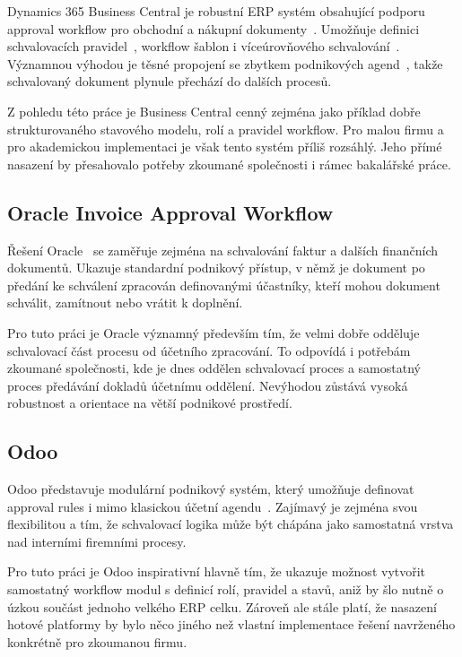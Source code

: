 Dynamics 365 Business Central je robustní ERP systém obsahující podporu approval workflow pro obchodní a nákupní dokumenty~\cite{ref10}. Umožňuje definici schvalovacích pravidel~\cite{ref12}, workflow šablon i víceúrovňového schvalování~\cite{ref11}. Významnou výhodou je těsné propojení se zbytkem podnikových agend~\cite{ref13}, takže schvalovaný dokument plynule přechází do dalších procesů.

Z pohledu této práce je Business Central cenný zejména jako příklad dobře strukturovaného stavového modelu, rolí a pravidel workflow. Pro malou firmu a pro akademickou implementaci je však tento systém příliš rozsáhlý. Jeho přímé nasazení by přesahovalo potřeby zkoumané společnosti i rámec bakalářské práce.


\subsection{Oracle Invoice Approval Workflow}

Řešení Oracle~\cite{ref14, ref15, ref16} se zaměřuje zejména na schvalování faktur a dalších finančních dokumentů. Ukazuje standardní podnikový přístup, v němž je dokument po předání ke schválení zpracován definovanými účastníky, kteří mohou dokument schválit, zamítnout nebo vrátit k doplnění.

Pro tuto práci je Oracle významný především tím, že velmi dobře odděluje schvalovací část procesu od účetního zpracování. To odpovídá i potřebám zkoumané společnosti, kde je dnes oddělen schvalovací proces a samostatný proces předávání dokladů účetnímu oddělení. Nevýhodou zůstává vysoká robustnost a orientace na větší podnikové prostředí.


\subsection{Odoo}

Odoo představuje modulární podnikový systém, který umožňuje definovat approval rules i mimo klasickou účetní agendu~\cite{ref17, ref18}. Zajímavý je zejména svou flexibilitou a tím, že schvalovací logika může být chápána jako samostatná vrstva nad interními firemními procesy.

Pro tuto práci je Odoo inspirativní hlavně tím, že ukazuje možnost vytvořit samostatný workflow modul s definicí rolí, pravidel a stavů, aniž by šlo nutně o úzkou součást jednoho velkého ERP celku. Zároveň ale stále platí, že nasazení hotové platformy by bylo něco jiného než vlastní implementace řešení navrženého konkrétně pro zkoumanou firmu.


